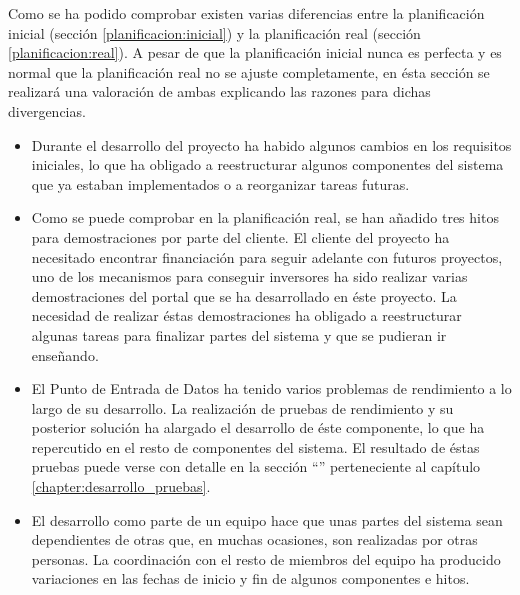Como se ha podido comprobar existen varias diferencias entre la planificación inicial (sección \ref{planificacion:inicial}) y la planificación real (sección \ref{planificacion:real}).  A pesar de que la planificación inicial nunca es perfecta y es normal que la planificación real no se ajuste completamente, en ésta sección se realizará una valoración de ambas explicando las razones para dichas divergencias.

\begin{itemize}
	\item
		Durante el desarrollo del proyecto ha habido algunos cambios en los requisitos iniciales, lo que ha obligado a reestructurar algunos componentes del sistema que ya estaban implementados o a reorganizar tareas futuras.
	\item
		Como se puede comprobar en la planificación real, se han añadido tres hitos para demostraciones por parte del cliente.  El cliente del proyecto ha necesitado encontrar financiación para seguir adelante con futuros proyectos, uno de los mecanismos para conseguir inversores ha sido realizar varias demostraciones del portal que se ha desarrollado en éste proyecto.  La necesidad de realizar éstas demostraciones ha obligado a reestructurar algunas tareas para finalizar partes del sistema y que se pudieran ir enseñando.
	\item
		El Punto de Entrada de Datos ha tenido varios problemas de rendimiento a lo largo de su desarrollo.  La realización de pruebas de rendimiento y su posterior solución ha alargado el desarrollo de éste componente, lo que ha repercutido en el resto de componentes del sistema.  El resultado de éstas pruebas puede verse con detalle en la sección ``'' perteneciente al capítulo \ref{chapter:desarrollo_pruebas}.
	\item
		El desarrollo como parte de un equipo hace que unas partes del sistema sean dependientes de otras que, en muchas ocasiones, son realizadas por otras personas.  La coordinación con el resto de miembros del equipo ha producido variaciones en las fechas de inicio y fin de algunos componentes e hitos.
\end{itemize}